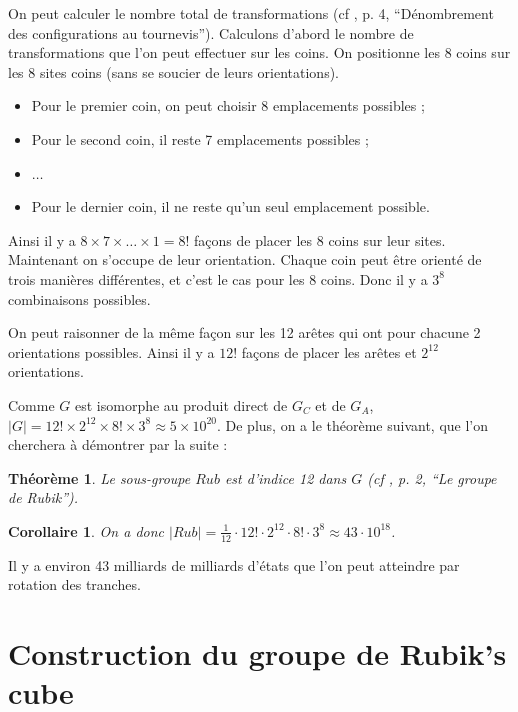 \documentclass[french]{report}
\newtheorem{theorem}{Théorème}
\newtheorem*{corollary}{Corollaire}
\begin{document}
On peut calculer le nombre total de transformations (cf \cite{culture_ens}, p. 4, ``Dénombrement des configurations au tournevis''). Calculons d'abord le nombre de transformations que l'on peut effectuer sur les coins. On positionne les 8 coins sur les 8 sites coins (sans se soucier de leurs orientations).

\begin{itemize}
  \item Pour le premier coin, on peut choisir 8 emplacements possibles ;
  \item Pour le second coin, il reste 7 emplacements possibles ;
  \item $\dots$
  \item Pour le dernier coin, il ne reste qu'un seul emplacement possible.
\end{itemize}

Ainsi il y a $8 \times 7 \times \dots \times 1 = 8!  $ façons de placer les 8 coins sur leur sites. Maintenant on s'occupe de leur orientation. Chaque coin peut être orienté de trois manières différentes, et c'est le cas pour les 8 coins. Donc il y a $3 ^8$ combinaisons possibles.

On peut raisonner de la même façon sur les 12 arêtes qui ont pour chacune 2 orientations possibles. Ainsi il y a $12!$ façons de placer les arêtes et $2 ^{12}$ orientations.

Comme $G$ est isomorphe au produit direct de $G_C$ et de $G_A$,  $\mid G \mid = 12! \times 2 ^{12} \times 8! \times 3 ^{8} \approx 5 \times 10 ^{20}$. De plus, on a le théorème suivant, que l'on cherchera à démontrer par la suite :

\begin{theorem}
  Le sous-groupe $Rub$ est d'indice 12 dans $G$ (cf \cite{colmez_rubik}, p. 2, ``Le groupe de Rubik'').
\end{theorem}

\begin{corollary}
  On a donc $\mid Rub \mid = \frac{1}{12} \cdot 12! \cdot 2 ^{12}\cdot 8! \cdot 3 ^{8} \approx 43 \cdot 10 ^{18}$.
\end{corollary}

Il y a environ 43 milliards de milliards d'états que l'on peut atteindre par rotation des tranches.


\chapter{Construction du groupe de Rubik's cube} \label{construction}
\end{document}
